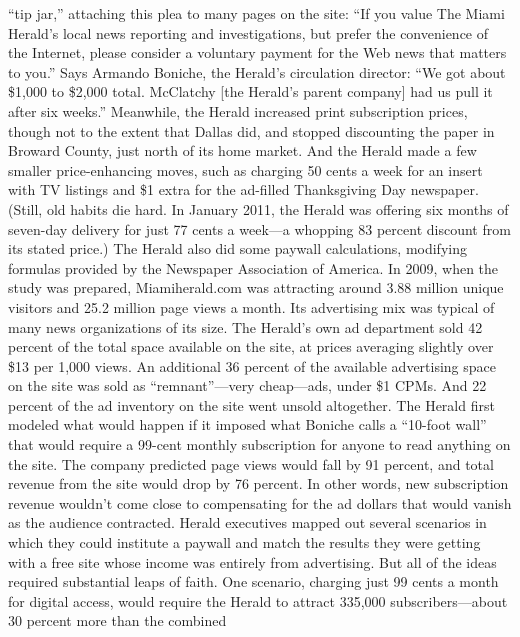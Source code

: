 ``tip jar,'' attaching this plea to many pages on the site: ``If you value The Miami
Herald’s local news reporting and investigations, but prefer the convenience of
the Internet, please consider a voluntary payment for the Web news that matters
to you.'' Says Armando Boniche, the Herald’s circulation director: ``We got about
\$1,000 to \$2,000 total. McClatchy [the Herald’s parent company] had us pull it
after six weeks.''
Meanwhile, the Herald increased print subscription prices, though not to the
extent that Dallas did, and stopped discounting the paper in Broward County, just
north of its home market. And the Herald made a few smaller price-enhancing
moves, such as charging 50 cents a week for an insert with TV listings and \$1
extra for the ad-filled Thanksgiving Day newspaper. (Still, old habits die hard. In
January 2011, the Herald was offering six months of seven-day delivery for just
77 cents a week—a whopping 83 percent discount from its stated price.)
The Herald also did some paywall calculations, modifying formulas provided
by the Newspaper Association of America. In 2009, when the study was prepared,
Miamiherald.com was attracting around 3.88 million unique visitors and
25.2 million page views a month. Its advertising mix was typical of many news
organizations of its size. The Herald’s own ad department sold 42 percent of the
total space available on the site, at prices averaging slightly over \$13 per 1,000
views. An additional 36 percent of the available advertising space on the site was
sold as ``remnant''—very cheap—ads, under \$1 CPMs. And 22 percent of the ad
inventory on the site went unsold altogether.
The Herald first modeled what would happen if it imposed what Boniche calls
a ``10-foot wall'' that would require a 99-cent monthly subscription for anyone
to read anything on the site. The company predicted page views would fall by
91 percent, and total revenue from the site would drop by 76 percent. In other
words, new subscription revenue wouldn’t come close to compensating for the
ad dollars that would vanish as the audience contracted.
Herald executives mapped out several scenarios in which they could institute
a paywall and match the results they were getting with a free site whose
income was entirely from advertising. But all of the ideas required substantial
leaps of faith.
One scenario, charging just 99 cents a month for digital access, would require
the Herald to attract 335,000 subscribers—about 30 percent more than the combined
